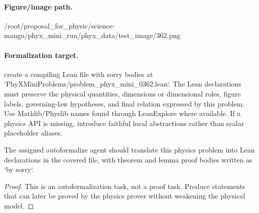 \paragraph{Figure/image path.}
/root/proposal\_for\_physic/science-mango/phyx\_mini\_run/phyx\_data/test\_image/362.png

\paragraph{Formalization target.}
create a compiling Lean file with sorry bodies at `PhyXMiniProblems/problem\_phyx\_mini\_0362.lean`. The Lean declarations must preserve the physical quantities, dimensions or dimensional roles, figure labels, governing-law hypotheses, and final relation expressed by this problem.
Use Mathlib/Physlib names found through LeanExplore where available. If a physics API is missing, introduce faithful local abstractions rather than scalar placeholder aliases.

\begin{theorem}
\label{thm:physics:phyx_mini_0362:target}
The assigned autoformalize agent should translate this physics problem into Lean declarations in the covered file, with theorem and lemma proof bodies written as `by sorry`.
\end{theorem}
\begin{proof}
This is an autoformalization task, not a proof task. Produce statements that can later be proved by the physics prover without weakening the physical model.
\end{proof}

